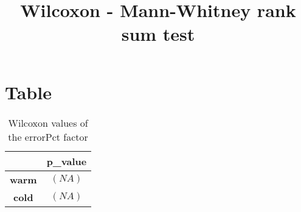 \documentclass{article}
\title{Wilcoxon - Mann-Whitney rank sum test}
\author{}
\begin{document}
\maketitle
\section{Table}
\begin{table}[!htp]
  \caption{Wilcoxon values of the errorPct factor}
  \label{table:errorPct}
  \centering
  \begin{scriptsize}
  \begin{tabular}{c|c}
      & \textbf{p\_value} \\\hline
      \textbf{warm} & $(NA)$ \\
      \textbf{cold} & $(NA)$ \\
  \end{tabular}
  \end{scriptsize}
\end{table}
\end{document}
